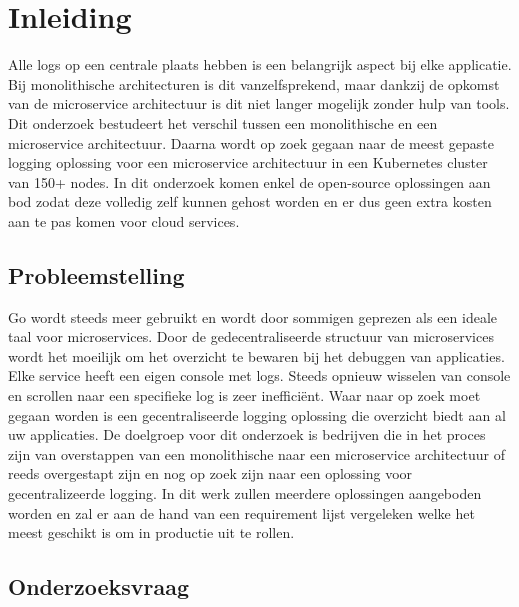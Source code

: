 
\chapter{Inleiding}
\label{ch:inleiding}

Alle logs op een centrale plaats hebben is een belangrijk aspect bij elke applicatie. Bij monolithische architecturen is dit vanzelfsprekend, maar dankzij de opkomst van de microservice architectuur is dit niet langer mogelijk zonder hulp van tools. Dit onderzoek bestudeert het verschil tussen een monolithische en een microservice architectuur. Daarna wordt op zoek gegaan naar de meest gepaste logging oplossing voor een microservice architectuur in een Kubernetes cluster van 150+ nodes. In dit onderzoek komen enkel de open-source oplossingen aan bod zodat deze volledig zelf kunnen gehost worden en er dus geen extra kosten aan te pas komen voor cloud services. 

\section{Probleemstelling}
\label{sec:probleemstelling}

Go wordt steeds meer gebruikt en wordt door sommigen geprezen als een ideale taal voor microservices. Door de gedecentraliseerde structuur van microservices wordt het moeilijk om het overzicht te bewaren bij het debuggen van applicaties. Elke service heeft een eigen console met logs. Steeds opnieuw wisselen van console en scrollen naar een specifieke log is zeer inefficiënt. Waar naar op zoek moet gegaan worden is een gecentraliseerde logging oplossing die overzicht biedt aan al uw applicaties. De doelgroep voor dit onderzoek is bedrijven die in het proces zijn van overstappen van een monolithische naar een microservice architectuur of reeds overgestapt zijn en nog op zoek zijn naar een oplossing voor gecentralizeerde logging. In dit werk zullen meerdere oplossingen aangeboden worden en zal er aan de hand van een requirement lijst vergeleken welke het meest geschikt is om in productie uit te rollen.

\section{Onderzoeksvraag}
\label{sec:onderzoeksvraag}

